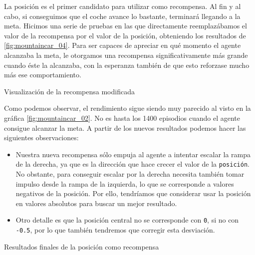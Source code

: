 La posición es el primer candidato para utilizar como recompensa. Al fin y al cabo, si conseguimos que el coche avance lo bastante, terminará llegando a la meta. Hicimos una serie de pruebas en las que directamente reemplazábamos el valor de la recompensa por el valor de la posición, obteniendo los resultados de \ref{fig:mountaincar_04}. Para ser capaces de apreciar en qué momento el agente alcanzaba la meta, le otorgamos una recompensa significativamente más grande cuando éste la alcanzaba, con la esperanza también de que esto reforzase mucho más ese comportamiento.

%
       {Visualización de la recompensa modificada}

Como podemos observar, el rendimiento sigue siendo muy parecido al visto en la gráfica \ref{fig:mountaincar_02}. No es hasta los 1400 episodios cuando el agente consigue alcanzar la meta. A partir de los nuevos resultados podemos hacer las siguientes observaciones:

\begin{itemize}
    \item Nuestra nueva recompensa sólo empuja al agente a intentar escalar la rampa de la derecha, ya que es la dirección que hace crecer el valor de la \texttt{posición}. No obstante, para conseguir escalar por la derecha necesita también tomar impulso desde la rampa de la izquierda, lo que se corresponde a valores negativos de la posición. Por ello, tendríamos que considerar usar la posición en valores absolutos para buscar un mejor resultado.
    \item Otro detalle es que la posición central no se corresponde con \texttt{0}, si no con \texttt{-0.5}, por lo que también tendremos que corregir esta desviación.
\end{itemize}

%
       {Resultados finales de la posición como recompensa}

